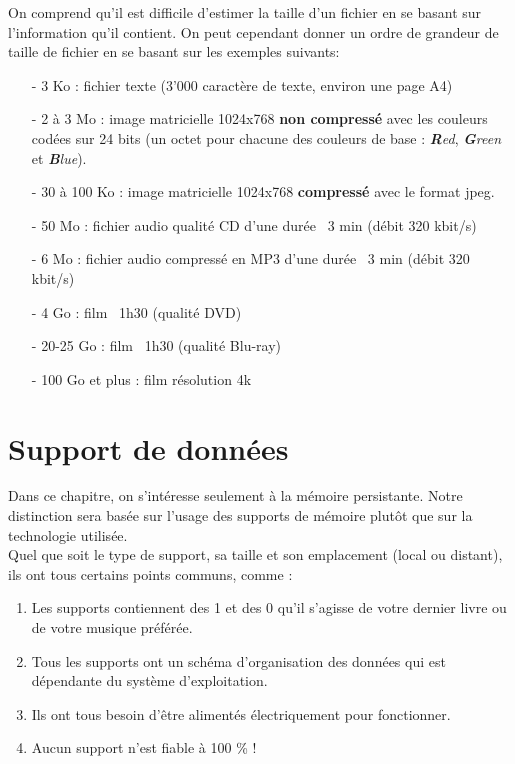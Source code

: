 On comprend qu'il est difficile d'estimer la taille d'un fichier en se basant sur l'information qu'il contient. On peut cependant donner un ordre de grandeur de taille de fichier en se basant sur les exemples suivants:
\begin{enumerate}
	\item[-] 3 Ko :        fichier texte (3’000 caractère de texte, environ une page A4)
	
	\item[-] 2 à 3 Mo :   image matricielle 1024x768 \textbf{non compressé} avec les couleurs codées sur 24 bits (un octet pour chacune des couleurs de base : \textit{\textbf{R}ed}, \textit{\textbf{G}reen} et \textit{\textbf{B}lue}).
	\item[-] 30 à 100 Ko :    image matricielle 1024x768 \textbf{compressé} avec le format jpeg.
	\item[-] 50 Mo :     fichier audio qualité CD d’une durée ~3 min (débit 320 kbit/s)
	\item[-] 6 Mo :     fichier audio compressé en  MP3 d’une durée ~3 min (débit 320 kbit/s)
	\item[-] 4 Go :     film ~1h30 (qualité DVD)
	\item[-] 20-25 Go :      film ~1h30 (qualité Blu-ray)
	\item[-] 100 Go et plus :     film résolution 4k
\end{enumerate}


\section{Support de données}
Dans ce chapitre, on s'intéresse seulement à la mémoire persistante. Notre distinction sera basée sur l'usage des supports de mémoire plutôt que sur la technologie utilisée.\\

Quel que soit le type de support, sa taille et son emplacement (local ou distant), ils ont tous certains points communs, comme :
\begin{enumerate}
	\item Les supports contiennent des 1 et des 0 qu’il s’agisse de votre dernier livre ou de votre musique préférée.
	\item Tous les supports ont un schéma d’organisation des données qui est dépendante du système d’exploitation.
	\item Ils ont tous besoin d’être alimentés électriquement pour fonctionner.
	\item Aucun support n’est fiable à 100 \% !
\end{enumerate}

